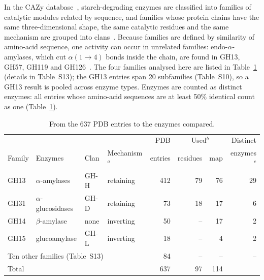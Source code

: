 \documentclass[preprint,12pt]{elsarticle}
\begin{document}
In the CAZy database~\citep{Drula2022}, starch-degrading enzymes are classified into families of catalytic modules
related by sequence, and families whose protein chains have the same three-dimensional shape, the same catalytic residues and the same mechanism are grouped into
clans~\citep{Henrissat1996}. Because families are defined by similarity of amino-acid sequence, one activity can occur in unrelated families: endo-$\alpha$-amylases, which cut $\alpha(1\!\to\!4)$ bonds inside the chain, are found in GH13, GH57, GH119 and GH126~\citep{Janecek2014}. The four families analysed here are listed in Table~\ref{tab:families} (details in Table~S13); the GH13 entries span
20 subfamilies (Table~S10), so a GH13 result is pooled across enzyme types. Enzymes are counted as distinct enzymes: all entries whose amino-acid sequences are at least 50\% identical count as one (Table~\ref{tab:families}).

\begin{table}[t]
\centering
\caption{From the 637 PDB entries to the enzymes compared.}
\label{tab:families}
\small\setlength{\tabcolsep}{4pt}
\begin{tabular}{llllrrrr}
\toprule
 & & & & PDB & \multicolumn{2}{c}{Used$^b$} & Distinct\\
Family & Enzymes & Clan & Mechanism$^a$ & entries & residues & map & enzymes$^c$\\
\midrule
GH13 & $\alpha$-amylases & GH-H & retaining & 412 & 79 & 76 & 29\\
GH31 & $\alpha$-glucosidases & GH-D & retaining & 73 & 18 & 17 & 6\\
GH14 & $\beta$-amylase & none & inverting & 50 & -- & 17 & 2\\
GH15 & glucoamylase & GH-L & inverting & 18 & -- & 4 & 2\\
\multicolumn{4}{l}{Ten other families (Table~S13)} & 84 & -- & -- & --\\
\midrule
\multicolumn{4}{l}{Total} & 637 & 97 & 114 & \\
\bottomrule
\end{tabular}
\par\smallskip{}
\end{table}
\end{document}
